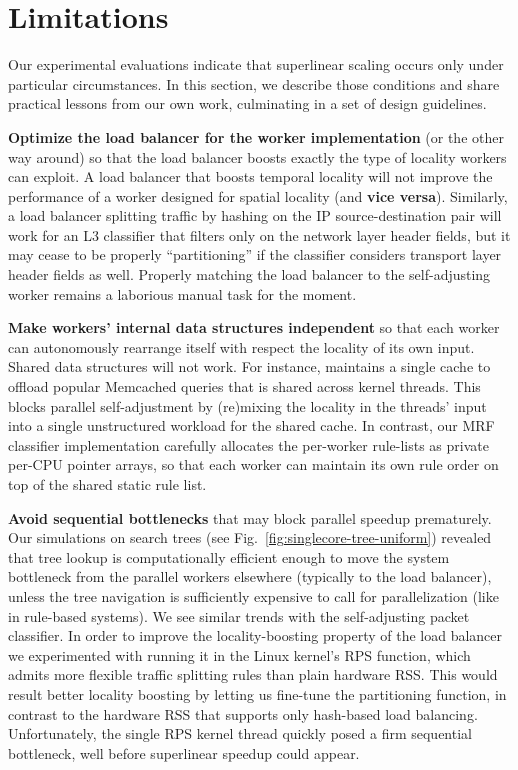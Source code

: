\section{Limitations}
\label{sec:discussion}

Our experimental evaluations indicate that superlinear scaling occurs only under particular circumstances. In this section, we describe those conditions and share practical lessons from our own work, culminating in a set of design guidelines.

\noindent%
\textbf{Optimize the load balancer for the worker implementation} (or the other way around) so that the load balancer boosts exactly the type of locality workers can exploit. A load balancer that boosts temporal locality will not improve the performance of a worker designed for spatial locality (and \textbf{vice versa}). Similarly, a load balancer splitting traffic by hashing on the IP source-destination pair will work for an L3 classifier that filters only on the network layer header fields, but it may cease to be properly ``partitioning'' if the classifier considers transport layer header fields as well. Properly matching the load balancer to the self-adjusting worker remains a laborious manual task for the moment.

\noindent%
\textbf{Make workers' internal data structures independent} so that each worker can autonomously rearrange itself with respect the locality of its own input. Shared data structures will not work. For instance, \cite{ghigoff2021bmc} maintains a single cache to offload popular Memcached queries that is shared across kernel threads. This blocks parallel self-adjustment by (re)mixing the locality in the threads' input into a single unstructured workload for the shared cache. In contrast, our MRF classifier implementation carefully allocates the per-worker rule-lists as private per-CPU pointer arrays, so that each worker can maintain its own rule order on top of the shared static rule list.

\noindent%
\textbf{Avoid sequential bottlenecks} that may block parallel speedup prematurely. Our simulations on search trees (see Fig.~\ref{fig:singlecore-tree-uniform}) revealed that tree lookup is computationally efficient enough to move the system bottleneck from the parallel workers elsewhere (typically to the load balancer), unless the tree navigation is sufficiently expensive to call for parallelization (like in rule-based systems). We see similar trends with the self-adjusting packet classifier. In order to improve the locality-boosting property of the load balancer we experimented with running it in the Linux kernel's RPS function, which admits more flexible traffic splitting rules than plain hardware RSS. This would result better locality boosting by letting us fine-tune the partitioning function, in contrast to the hardware RSS that supports only hash-based load balancing. Unfortunately, the single RPS kernel thread quickly posed a firm sequential bottleneck, well before superlinear speedup could appear.

